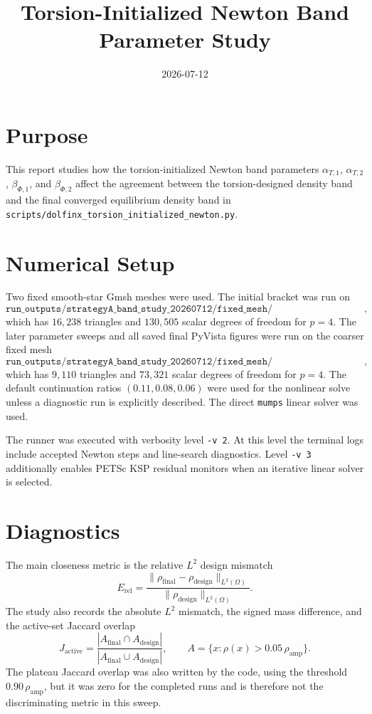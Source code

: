 \documentclass[11pt]{article}
\title{Torsion-Initialized Newton Band Parameter Study}
\author{}
\date{2026-07-12}
\begin{document}
\maketitle

\section{Purpose}

This report studies how the torsion-initialized Newton band parameters
\(\alpha_{T,1}\), \(\alpha_{T,2}\), \(\beta_{\Phi,1}\), and
\(\beta_{\Phi,2}\) affect the agreement between the torsion-designed density
band and the final converged equilibrium density band in
\texttt{scripts/dolfinx\_torsion\_initialized\_newton.py}.

\section{Numerical Setup}

Two fixed smooth-star Gmsh meshes were used.  The initial bracket was run on
\[
\texttt{run\_outputs/strategyA\_band\_study\_20260712/fixed\_mesh/smooth\_star\_h007\_n300.msh},
\]
which has \(16{,}238\) triangles and \(130{,}505\) scalar degrees of freedom
for \(p=4\).  The later parameter sweeps and all saved final PyVista figures
were run on the coarser fixed mesh
\[
\texttt{run\_outputs/strategyA\_band\_study\_20260712/fixed\_mesh/smooth\_star\_h010\_n220.msh},
\]
which has \(9{,}110\) triangles and \(73{,}321\) scalar degrees of freedom for
\(p=4\).  The default continuation ratios \((0.11,0.08,0.06)\) were used for
the nonlinear solve unless a diagnostic run is explicitly described.  The
direct \texttt{mumps} linear solver was used.

The runner was executed with verbosity level \texttt{-v 2}.  At this level the
terminal logs include accepted Newton steps and line-search diagnostics.  Level
\texttt{-v 3} additionally enables PETSc KSP residual monitors when an
iterative linear solver is selected.

\section{Diagnostics}

The main closeness metric is the relative \(L^2\) design mismatch
\[
E_{\mathrm{rel}}
 =
\frac{\|\rho_{\mathrm{final}}-\rho_{\mathrm{design}}\|_{L^2(\Omega)}}
     {\|\rho_{\mathrm{design}}\|_{L^2(\Omega)}}.
\]
The study also records the absolute \(L^2\) mismatch, the signed mass
difference, and the active-set Jaccard overlap
\[
J_{\mathrm{active}}
=
\frac{|A_{\mathrm{final}}\cap A_{\mathrm{design}}|}
     {|A_{\mathrm{final}}\cup A_{\mathrm{design}}|},
\qquad
A = \{x : \rho(x) > 0.05\,\rho_{\mathrm{amp}}\}.
\]
The plateau Jaccard overlap was also written by the code, using the threshold
\(0.90\,\rho_{\mathrm{amp}}\), but it was zero for the completed runs and is
therefore not the discriminating metric in this sweep.
\end{document}
